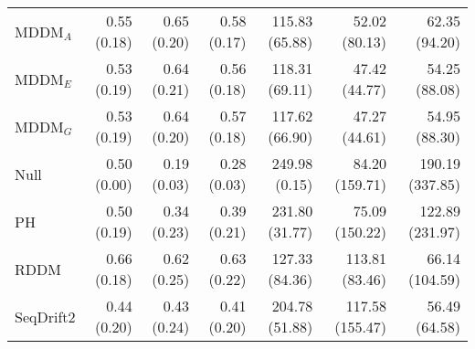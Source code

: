 \begin{tabular}{lrrrrrr}
MDDM$_A$   &       0.55 (0.18) &       0.65 (0.20) &       0.58 (0.17) &      115.83 (65.88) &       52.02 (80.13) &      62.35 (94.20) \\
MDDM$_E$   &       0.53 (0.19) &       0.64 (0.21) &       0.56 (0.18) &      118.31 (69.11) &       47.42 (44.77) &      54.25 (88.08) \\
MDDM$_G$   &       0.53 (0.19) &       0.64 (0.20) &       0.57 (0.18) &      117.62 (66.90) &       47.27 (44.61) &      54.95 (88.30) \\
Null &       0.50 (0.00) &       0.19 (0.03) &       0.28 (0.03) &       249.98 (0.15) &      84.20 (159.71) &    190.19 (337.85) \\
PH  &       0.50 (0.19) &       0.34 (0.23) &       0.39 (0.21) &      231.80 (31.77) &      75.09 (150.22) &    122.89 (231.97) \\
RDDM         &       0.66 (0.18) &       0.62 (0.25) &       0.63 (0.22) &      127.33 (84.36) &      113.81 (83.46) &     66.14 (104.59) \\
SeqDrift2    &       0.44 (0.20) &       0.43 (0.24) &       0.41 (0.20) &      204.78 (51.88) &     117.58 (155.47) &      56.49 (64.58) \\
\bottomrule
\end{tabular}
